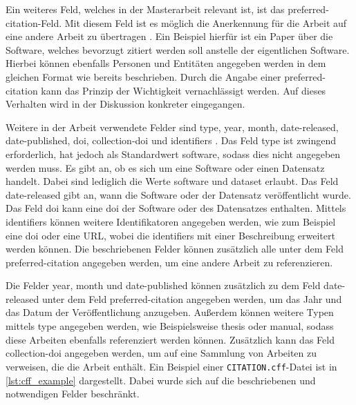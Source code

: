 Ein weiteres Feld, welches in der Masterarbeit relevant ist, ist das \glqq preferred-citation\grqq{}-Feld.
Mit diesem Feld ist es möglich die Anerkennung für die Arbeit auf eine andere Arbeit zu übertragen \autocite{druskat_citation_2021}.
Ein Beispiel hierfür ist ein Paper über die Software, welches bevorzugt zitiert werden soll anstelle der eigentlichen Software.
Hierbei können ebenfalls Personen und Entitäten angegeben werden in dem gleichen Format wie bereits beschrieben.
Durch die Angabe einer \glqq preferred-citation\grqq{} kann das Prinzip der Wichtigkeit vernachlässigt werden.
Auf dieses Verhalten wird in der Diskussion konkreter eingegangen.

Weitere in der Arbeit verwendete Felder sind \glqq type\grqq{}, \glqq year\grqq{}, \glqq month\grqq{}, \glqq date-released\grqq{}, \glqq date-published\grqq{}, \glqq doi\grqq{}, \glqq collection-doi\grqq{} und \glqq identifiers\grqq{} \autocite{druskat_citation_2021}.
Das Feld \glqq type\grqq{} ist zwingend erforderlich, hat jedoch als Standardwert \glqq software\grqq{}, sodass dies nicht angegeben werden muss.
Es gibt an, ob es sich um eine Software oder einen Datensatz handelt.
Dabei sind lediglich die Werte \glqq software\grqq{} und \glqq dataset\grqq{} erlaubt.
Das Feld \glqq date-released\grqq{} gibt an, wann die Software oder der Datensatz veröffentlicht wurde.
Das Feld \glqq doi\grqq{} kann eine \gls{doi} der Software oder des Datensatzes enthalten.
Mittels \glqq identifiers\grqq{} können weitere Identifikatoren angegeben werden, wie zum Beispiel eine \gls{doi} oder eine URL, wobei die \glqq identifiers\grqq{} mit einer Beschreibung erweitert werden können.
Die beschriebenen Felder können zusätzlich alle unter dem Feld \glqq preferred-citation\grqq{} angegeben werden, um eine andere Arbeit zu referenzieren.

Die Felder \glqq year\grqq{}, \glqq month\grqq{} und \glqq date-published\grqq{} können zusätzlich zu dem Feld \glqq date-released\grqq{} unter dem Feld \glqq preferred-citation\grqq{} angegeben werden, um das Jahr und das Datum der Veröffentlichung anzugeben.
Außerdem können weitere Typen mittels \glqq type\grqq{} angegeben werden, wie Beispielsweise \glqq thesis\grqq{} oder \glqq manual\grqq{}, sodass diese Arbeiten ebenfalls referenziert werden können.
Zusätzlich kann das Feld \glqq collection-doi\grqq{} angegeben werden, um auf eine Sammlung von Arbeiten zu verweisen, die die Arbeit enthält.
Ein Beispiel einer \texttt{CITATION.cff}-Datei ist in \autoref{lst:cff_example} dargestellt.
Dabei wurde sich auf die beschriebenen und notwendigen Felder beschränkt.

